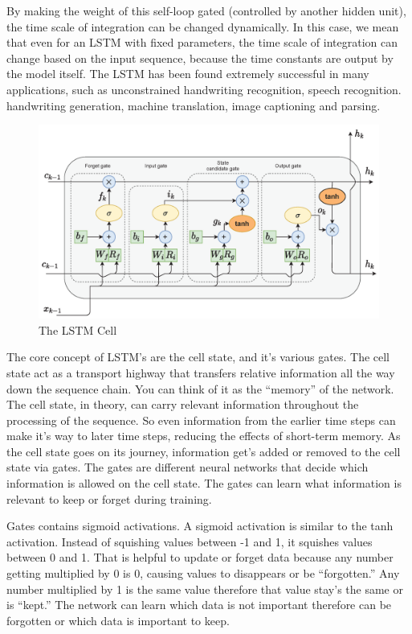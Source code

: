 \documentclass{report}
\begin{document}
By making the weight of this self-loop gated (controlled by another hidden unit), the time scale of integration can be changed dynamically. In this case, we mean that even for an LSTM with fixed parameters, the time scale of integration can change based on the input sequence, because the time constants are output by the model itself. The LSTM has been found extremely successful in many applications, such as unconstrained handwriting recognition, speech recognition. handwriting generation, machine translation, image captioning and parsing.

\begin{figure}[ht]
	\includegraphics[width=350pt]{43}
	\centering
	\caption{The LSTM Cell}
\end{figure}

The core concept of LSTM’s are the cell state, and it’s various gates. The cell state act as a transport highway that transfers relative information all the way down the sequence chain. You can think of it as the “memory” of the network. The cell state, in theory, can carry relevant information throughout the processing of the sequence. So even information from the earlier time steps can make it’s way to later time steps, reducing the effects of short-term memory. As the cell state goes on its journey, information get’s added or removed to the cell state via gates. The gates are different neural networks that decide which information is allowed on the cell state. The gates can learn what information is relevant to keep or forget during training.

Gates contains sigmoid activations. A sigmoid activation is similar to the tanh activation. Instead of squishing values between -1 and 1, it squishes values between 0 and 1. That is helpful to update or forget data because any number getting multiplied by 0 is 0, causing values to disappears or be “forgotten.” Any number multiplied by 1 is the same value therefore that value stay’s the same or is “kept.” The network can learn which data is not important therefore can be forgotten or which data is important to keep.
\end{document}
